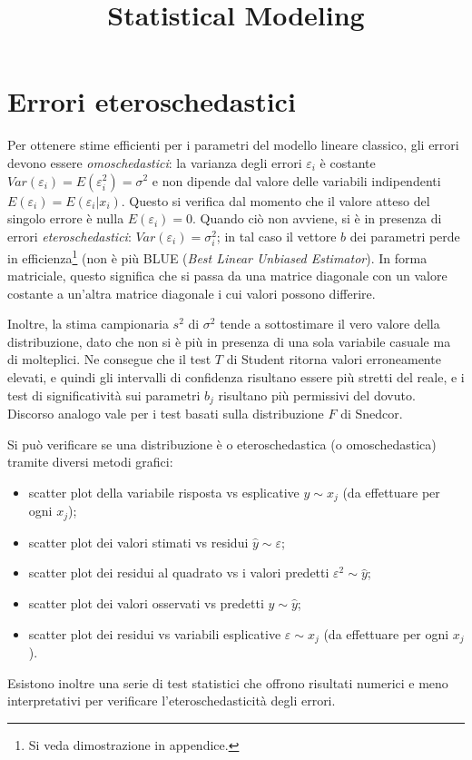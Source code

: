 \documentclass[a4page, 11pt]{article} %
\title{Statistical Modeling}
\author{}
\date{}
\begin{document}
\maketitle
\tableofcontents %
\newpage

\section{Errori eteroschedastici}
Per ottenere stime efficienti per i parametri del modello lineare classico, gli errori devono essere \textit{omoschedastici}: la varianza degli errori $\varepsilon_i$ è costante $Var(\varepsilon_i) = E(\varepsilon_i^2) = \sigma^2$ e non dipende dal valore delle variabili indipendenti $E(\varepsilon_i) = E(\varepsilon_i | x_i)$.
Questo si verifica dal momento che il valore atteso del singolo errore è nulla $E(\varepsilon_i) = 0$.
Quando ciò non avviene, si è in presenza di errori \textit{eteroschedastici}: $Var(\varepsilon_i) = \sigma_i^2$; in tal caso il vettore $b$ dei parametri perde in efficienza\footnote{Si veda dimostrazione in appendice.} (non è più BLUE (\textit{Best Linear Unbiased Estimator}).
In forma matriciale, questo significa che si passa da una matrice diagonale con un valore costante a un'altra matrice diagonale i cui valori possono differire.

Inoltre, la stima campionaria $s^2$ di $\sigma^2$ tende a sottostimare il vero valore della distribuzione, dato che non si è più in presenza di una sola variabile casuale ma di molteplici.
Ne consegue che il test $T$ di Student ritorna valori erroneamente elevati, e quindi gli intervalli di confidenza risultano essere più stretti del reale, e i test di significatività sui parametri $b_j$ risultano più permissivi del dovuto.
Discorso analogo vale per i test basati sulla distribuzione $F$ di Snedcor.

Si può verificare se una distribuzione è o eteroschedastica (o omoschedastica) tramite diversi metodi grafici:
\begin{itemize}[noitemsep]
  \item scatter plot della variabile risposta vs esplicative $y \sim x_j$ (da effettuare per ogni $x_j$);
  \item scatter plot dei valori stimati vs residui $\hat{y} \sim \varepsilon$;
  \item scatter plot dei residui al quadrato vs i valori predetti $\varepsilon^2 \sim \hat{y}$;
  \item scatter plot dei valori osservati vs predetti $y \sim \hat{y}$;
  \item scatter plot dei residui vs variabili esplicative $\varepsilon \sim x_j$ (da effettuare per ogni $x_j$).
\end{itemize}
Esistono inoltre una serie di test statistici che offrono risultati numerici e meno interpretativi per verificare l'eteroschedasticità degli errori.
\end{document}
